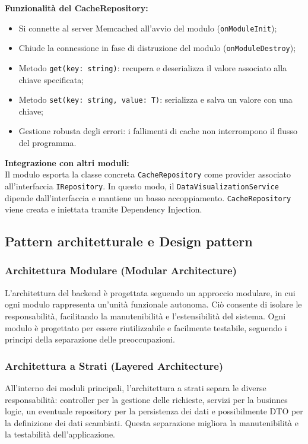 \textbf{Funzionalità del CacheRepository:}
\begin{itemize}
    \item Si connette al server Memcached all’avvio del modulo (\texttt{onModuleInit});
    \item Chiude la connessione in fase di distruzione del modulo (\texttt{onModuleDestroy});
    \item Metodo \texttt{get(key: string)}: recupera e deserializza il valore associato alla chiave specificata;
    \item Metodo \texttt{set(key: string, value: T)}: serializza e salva un valore con una chiave;
    \item Gestione robusta degli errori: i fallimenti di cache non interrompono il flusso del programma.
\end{itemize}

\textbf{Integrazione con altri moduli:} \\
Il modulo esporta la classe concreta \texttt{CacheRepository} come provider associato all'interfaccia \texttt{IRepository}. In questo modo, il \texttt{DataVisualizationService} dipende dall'interfaccia e mantiene un basso accoppiamento. \texttt{CacheRepository} viene creata e iniettata tramite Dependency Injection.


\subsection{Pattern architetturale e Design pattern}

\subsubsection{Architettura Modulare (Modular Architecture)}
L’architettura del backend è progettata seguendo un approccio modulare, in cui ogni modulo rappresenta un'unità funzionale autonoma. Ciò consente di isolare le responsabilità, facilitando la manutenibilità e l'estensibilità del sistema. Ogni modulo è progettato per essere riutilizzabile e facilmente testabile, seguendo i principi della separazione delle preoccupazioni.

\subsubsection{Architettura a Strati (Layered Architecture)}
All'interno dei moduli principali, l'architettura a strati separa le diverse responsabilità: controller per la gestione delle richieste, servizi per la businnes logic, un eventuale repository per la persistenza dei dati e possibilmente DTO per la definizione dei dati scambiati. Questa separazione migliora la manutenibilità e la testabilità dell'applicazione.


